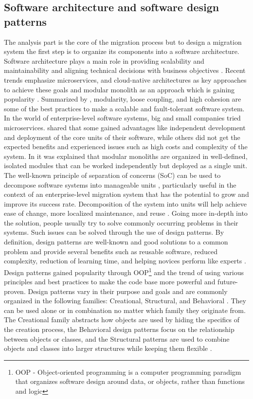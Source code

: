 \documentclass[twocolumn]{article}
\begin{document}
\subsection{Software architecture and software design patterns}
The analysis part is the core of the migration process but to design a migration system the first step is to organize its components into a software architecture. Software architecture plays a main role in providing scalability and maintainability and aligning technical decisions with business objectives \cite{Nivedhaa-2024}. Recent trends emphasize microservices, and cloud-native architectures as key approaches to achieve these goals \cite{Nivedhaa-2024} and modular monolith as an approach which is gaining popularity \cite{SuEtAl-2024}. Summarized by \cite{Nivedhaa-2024}, modularity, loose coupling, and high cohesion are some of the best practices to make a scalable and fault-tolerant software system. In the world of enterprise-level software systems, big and small companies tried microservices. \cite{SuEtAl-2024} shared that some gained advantages like independent development and deployment of the core units of their software, while others did not get the expected benefits and experienced issues such as high costs and complexity of the system. In \cite{SuEtAl-2024} it was explained that modular monoliths are organized in well-defined, isolated modules that can be worked independently but deployed as a single unit. The well-known principle of separation of concerns (SoC) can be used to decompose software systems into manageable units \cite{Daga-2006}, particularly useful in the context of an enterprise-level migration system that has the potential to grow and improve its success rate. Decomposition of the system into units will help achieve ease of change, more localized maintenance, and reuse \cite{Daga-2006}. Going more in-depth into the solution, people usually try to solve commonly occurring problems in their systems. Such issues can be solved through the use of design patterns. By definition, design patterns are well-known and good solutions to a common problem \cite{Martin-2000} and provide several benefits such as reusable software, reduced complexity, reduction of learning time, and helping novices perform like experts \cite{GammaEtAl-1993}. Design patterns gained popularity through OOP\footnote{OOP - Object-oriented programming is a computer programming paradigm that organizes software design around data, or objects, rather than functions and logic} and the trend of using various principles and best practices to make the code base more powerful and future-proven. Design patterns vary in their purpose and goals and are commonly organized in the following families: Creational, Structural, and Behavioral \cite{GammaEtAl-1993}. They can be used alone or in combination no matter which family they originate from. The Creational family abstracts how objects are used by hiding the specifics of the creation process, the Behavioral design patterns focus on the relationship between objects or classes, and the Structural patterns are used to combine objects and classes into larger structures while keeping them flexible \cite{GammaEtAl-1993}. 
\end{document}
